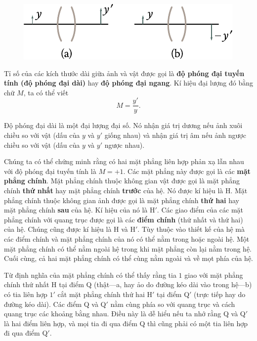 \begin{figure}[!htb]
	\begin{center}
		\includegraphics[scale=1]{figures/ch_16/fig_16_15.pdf}
        \caption[]{}
		\label{fig:16_15}
	\end{center}
	\vspace{-0.8cm}
\end{figure}

Tỉ số của các kích thước dài giữa ảnh và vật được gọi là \textbf{độ phóng đại tuyến tính (độ phóng đại dài)} hay  \textbf{độ phóng đại ngang}.
Kí hiệu đại lượng đó bằng chữ $M$, ta có thể viết
\begin{equation}\label{eq:16_56}
    M = \frac{y'}{y}.
\end{equation}

\noindent
Độ phóng đại dài là một đại lượng đại số.
Nó nhận giá trị dương nếu ảnh xuôi chiều so với vật (dấu của $y$ và $y'$ giống nhau) và nhận giá trị âm nếu ảnh ngược chiều so với vật (dấu của $y$ và $y'$ ngược nhau).

Chúng ta có thể chứng minh rằng có hai mặt phẳng liên hợp phản xạ lẫn nhau với độ phóng đại tuyến tính là $M=+1$.
Các mặt phẳng này được gọi là các \textbf{mặt phẳng chính}.
Mặt phẳng chính thuộc không gian vật được gọi là mặt phẳng chính \textbf{thứ nhất} hay mặt phẳng chính \textbf{trước} của hệ.
Nó được kí hiệu là H. Mặt phẳng chính thuộc không gian ảnh được gọi là mặt phẳng chính \textbf{thứ hai} hay mặt phẳng chính \textbf{sau} của hệ.
Kí hiệu của nó là H$'$.
Các giao điểm của các mặt phẳng chính với quang trục được gọi là các \textbf{điểm chính} (thứ nhất và thứ hai) của hệ.
Chúng cũng được kí hiệu là H và H$'$.
Tùy thuộc vào thiết kế của hệ mà các điểm chính và mặt phẳng chính của nó có thể nằm trong hoặc ngoài hệ.
Một mặt phẳng chính có thể nằm ngoài hệ trong khi mặt phẳng còn lại nằm trong hệ.
Cuối cùng, cả hai mặt phẳng chính có thể cùng nằm ngoài và về mọt phía của hệ.

Từ định nghĩa của mặt phẳng chính có thể thấy rằng tia $1$ giao với mặt phẳng chính thứ nhất H tại điểm Q (thật---a, hay ảo do đường kéo dài vào trong hệ---b) có tia liên hợp $1'$ cắt mặt phẳng chính thứ hai H$'$ tại điểm Q$'$ (trực tiếp hay do đường kéo dài). Các điểm Q và Q$'$ nằm cùng phía so với quang trục và cách quang trục các khoảng bằng nhau.
Điều này là dễ hiểu nếu ta nhớ rằng Q và Q$'$ là hai điểm liên hợp, và mọi tia đi qua điểm Q thì cũng phải có một tia liên hợp đi qua điểm Q$'$.

